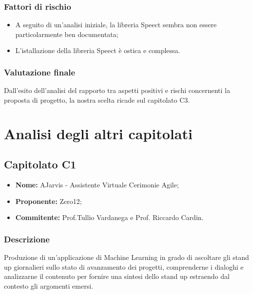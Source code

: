 \documentclass[openany,12pt,a4paper]{report}
\begin{document}
\subsection{Fattori di rischio}

\begin{itemize}
    \item A seguito di un'analisi iniziale, la libreria Speect sembra non essere particolarmente ben documentata;
    
    \item L'istallazione della libreria Speect è ostica e complessa.
\end{itemize}

\subsection{Valutazione finale}

Dall'esito dell'analisi del rapporto tra aspetti positivi e rischi concernenti la proposta di progetto, la nostra scelta ricade sul capitolato C3.

\chapter{Analisi degli altri capitolati}


\section{Capitolato C1}

\begin{itemize}
    \item \textbf{Nome:} AJarvis - Assistente Virtuale Cerimonie Agile;
    \item \textbf{Proponente:} Zero12;
    \item \textbf{Commitente:} Prof.Tullio Vardanega e Prof. Riccardo Cardin.
\end{itemize}

\subsection{Descrizione}

Produzione di un’applicazione di Machine Learning in grado di ascoltare gli stand up giornalieri sullo stato di avanzamento dei progetti, comprenderne i dialoghi e analizzarne il contenuto per fornire una sintesi dello stand up estraendo dal contesto gli argomenti emersi.
\end{document}
